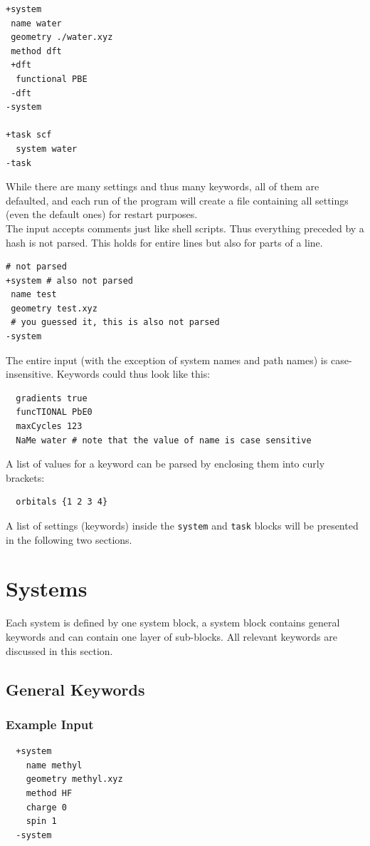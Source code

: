 \documentclass[bibliography=totocnumbered,a4paper,10pt,oneside]{scrbook}
\newcommand{\ttt}[1]{%
  \begingroup\setlength{\fboxsep}{1pt}%
  \colorbox{serenity-green!30}{\texttt{\hspace*{2pt}\vphantom{(g}#1\hspace*{2pt}}}%
  \endgroup
}
\begin{document}
\begin{lstlisting}
+system
 name water
 geometry ./water.xyz
 method dft
 +dft
  functional PBE
 -dft
-system

+task scf
  system water
-task
\end{lstlisting}
While there are many settings and thus many keywords, all of them are defaulted, and
each run of the program will create a file containing all settings (even the default ones)
for restart purposes.\\
The input accepts comments just like shell scripts.
Thus everything preceded  by a hash is not parsed.
This holds for entire lines but also for parts of a line.
\begin{lstlisting}
# not parsed
+system # also not parsed
 name test
 geometry test.xyz
 # you guessed it, this is also not parsed
-system
\end{lstlisting}
The entire input (with the exception of system names and path names) is case-insensitive.
Keywords could thus look like this:
\begin{lstlisting}
  gradients true
  funcTIONAL PbE0
  maxCycles 123
  NaMe water # note that the value of name is case sensitive
\end{lstlisting}
A list of values for a keyword can be parsed by enclosing them into curly brackets:
\begin{lstlisting}
  orbitals {1 2 3 4}
\end{lstlisting}
A list of settings (keywords) inside the \ttt{system} and \ttt{task} blocks will be
presented in the following two sections.

\newpage
\section{Systems}\label{sec:system}
Each system is defined by one system block, a system block contains general keywords and can contain one layer of sub-blocks.
All relevant keywords are discussed in this section.
\subsection{General Keywords}\label{sec:system:general}
\subsubsection{Example Input}
\begin{lstlisting}
  +system
    name methyl
    geometry methyl.xyz
    method HF
    charge 0
    spin 1
  -system
 \end{lstlisting}
\end{document}
